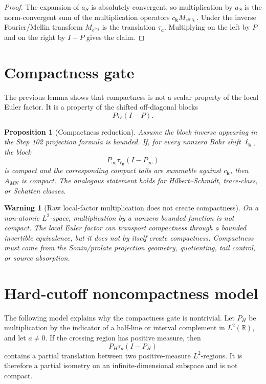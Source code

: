 \documentclass[11pt]{article}
\newtheorem{proposition}{Proposition}
\newtheorem{warning}{Warning}
\begin{document}
\begin{proof}
The expansion of \(a_S\) is absolutely convergent, so multiplication by
\(a_S\) is the norm-convergent sum of the multiplication operators
\(c_{\mathbf k}M_{e^{i\xi\ell_{\mathbf k}}}\).  Under the inverse
Fourier/Mellin transform \(M_{e^{ia\xi}}\) is the translation \(\tau_a\).
Multiplying on the left by \(P\) and on the right by \(I-P\) gives the
claim.
\end{proof}

\section{Compactness gate}

The previous lemma shows that compactness is not a scalar property of the
local Euler factor.  It is a property of the shifted off-diagonal blocks
\[
  P\tau_{\ell}(I-P).
\]

\begin{proposition}[Compactness reduction]
Assume the block inverse appearing in the Step 102 projection formula is
bounded.  If, for every nonzero Bohr shift \(\ell_{\mathbf k}\), the block
\[
  P_\infty\tau_{\ell_{\mathbf k}}(I-P_\infty)
\]
is compact and the corresponding compact tails are summable against
\(c_{\mathbf k}\), then \(A_{MN}\) is compact.  The analogous statement holds
for Hilbert--Schmidt, trace-class, or Schatten classes.
\end{proposition}

\begin{warning}[Raw local-factor multiplication does not create compactness]
On a non-atomic \(L^2\)-space, multiplication by a nonzero bounded function is
not compact.  The local Euler factor can transport compactness through a
bounded invertible equivalence, but it does not by itself create compactness.
Compactness must come from the Sonin/prolate projection geometry, quotienting,
tail control, or source absorption.
\end{warning}

\section{Hard-cutoff noncompactness model}

The following model explains why the compactness gate is nontrivial.  Let
\(P_H\) be multiplication by the indicator of a half-line or interval
complement in \(L^2(\mathbb R)\), and let \(a\ne0\).  If the crossing region
has positive measure, then
\[
  P_H\tau_a(I-P_H)
\]
contains a partial translation between two positive-measure \(L^2\)-regions.
It is therefore a partial isometry on an infinite-dimensional subspace and is
not compact.
\end{document}
